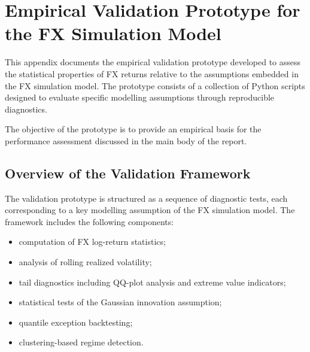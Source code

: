 \appendix
\section{Empirical Validation Prototype for the FX Simulation Model}

This appendix documents the empirical validation prototype developed to assess the statistical properties of FX returns relative to the assumptions embedded in the FX simulation model. The prototype consists of a collection of Python scripts designed to evaluate specific modelling assumptions through reproducible diagnostics.

The objective of the prototype is to provide an empirical basis for the performance assessment discussed in the main body of the report.

\subsection{Overview of the Validation Framework}

The validation prototype is structured as a sequence of diagnostic tests, each corresponding to a key modelling assumption of the FX simulation model. The framework includes the following components:

\begin{itemize}
	
	\item computation of FX log-return statistics;
	
	\item analysis of rolling realized volatility;
	
	\item tail diagnostics including QQ-plot analysis and extreme value indicators;
	
	\item statistical tests of the Gaussian innovation assumption;
	
	\item quantile exception backtesting;
	
	\item clustering-based regime detection.
	
\end{itemize}

